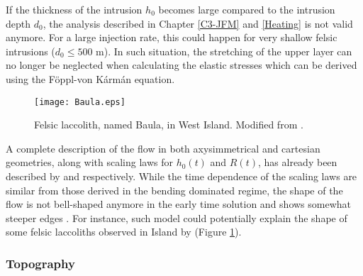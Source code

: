 If the thickness of the intrusion  $h_0$ becomes large compared to the
intrusion depth $d_0$, the  analysis described in Chapter \ref{C3-JFM}
and \ref{Heating} is not valid anymore. For a large injection rate, this
could happen for very shallow  felsic intrusions ($d_0\le 500$ m).  In
such situation,  the stretching of  the upper  layer can no  longer be
neglected when calculating  the elastic stresses which  can be derived
using the Föppl-von Kármán equation. 

\begin{figure}[h!]
  \begin{center}
    \graphicspath{ {/Users/thorey/Documents/These/Manuscript/Figure/Chapter7/} }
    \texttt{[image: Baula.eps]}
    \caption{Felsic laccolith, named Baula, in West Island. Modified
      from \citet{Anonymous:jHnLP36x}.}
    \label{C7-Baula}
  \end{center}
\end{figure}

A  complete  description  of  the  flow  in  both  axysimmetrical  and
cartesian geometries, along with scaling laws for $h_0(t)$ and $R(t)$,
has    already   been    described   by    \citet{Lister:2013ia}   and
\citet{Anonymous:QWXp_4JV} respectively.  While the time dependence of
the  scaling  laws are  similar  from  those  derived in  the  bending
dominated regime, the shape of the  flow is not bell-shaped anymore in
the   early   time  solution   and   shows   somewhat  steeper   edges
\citep{Anonymous:QWXp_4JV}.    For   instance,    such   model   could
potentially explain  the shape of  some felsic laccoliths  observed in
Island by \citet{Anonymous:jHnLP36x} (Figure \ref{C7-Baula}).

\subsubsection*{Topography}
\label{sec:topography-1}

